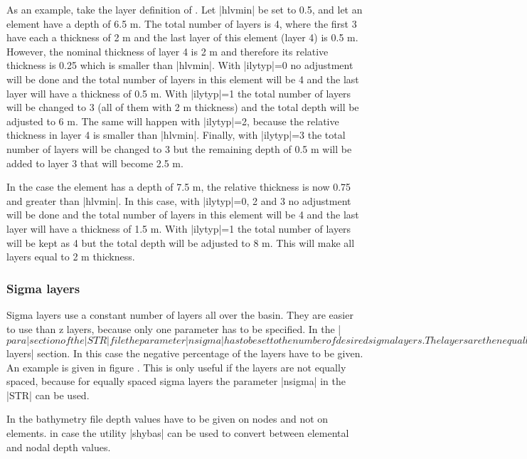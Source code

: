 As an example, take the layer definition of \Fig{}. Let |hlvmin|
be set to 0.5, and let an element have a depth of 6.5 m. The total number
of layers is 4, where the first 3 have each a thickness of 2 m and the
last layer of this element (layer 4) is 0.5 m. However, the nominal
thickness of layer 4 is 2 m and therefore its relative thickness is 0.25
which is smaller than |hlvmin|. With |ilytyp|=0 no adjustment will be
done and the total number of layers in this element will be 4 and the
last layer will have a thickness of 0.5 m.  With |ilytyp|=1 the total
number of layers will be changed to 3 (all of them with 2 m thickness)
and the total depth will be adjusted to 6 m. The same will happen with
|ilytyp|=2, because the relative thickness in layer 4 is smaller than
|hlvmin|.  Finally, with |ilytyp|=3 the total number of layers will be
changed to 3 but the remaining depth of 0.5 m will be added to layer 3
that will become 2.5 m.

In the case the element has a depth of 7.5 m, the relative thickness is
now 0.75 and greater than |hlvmin|.  In this case, with |ilytyp|=0, 2
and 3 no adjustment will be done and the total number of layers in this
element will be 4 and the last layer will have a thickness of 1.5 m.
With |ilytyp|=1 the total number of layers will be kept as 4 but the
total depth will be adjusted to 8 m. This will make all layers equal to
2 m thickness.

\subsubsection{Sigma layers}

Sigma layers use a constant number of layers all over the basin. They
are easier to use than z layers, because only one parameter has to
be specified. In the |$para| section of the |STR| file 
the parameter |nsigma| has to be set
to the number of desired sigma layers. The layers are then equally spaced
between each other.

Sigma layers can be also specified in the |$layers| section. In this case
the negative percentage of the layers have to be given.
An example is given in figure . This is only useful if
the layers are not equally spaced, because for equally spaced sigma layers
the parameter |nsigma| in the |STR| can be used.

In the bathymetry file depth values have to be given on nodes and not
on elements. in case the utility |shybas| can be used to convert between
elemental and nodal depth values.

